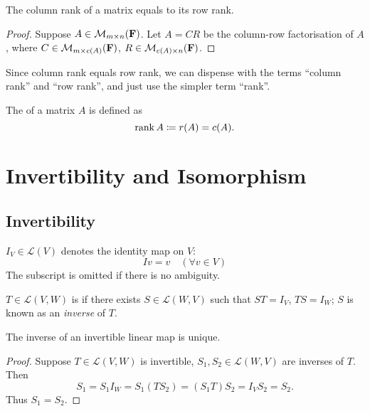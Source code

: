 \begin{lemma}
The column rank of a matrix equals to its row rank.
\end{lemma}

\begin{proof}
Suppose $A\in\mathcal{M}_{m\times n}(\mathbf F)$. Let $A=CR$ be the column-row factorisation of $A$, where $C\in\mathcal{M}_{m\times c(A)}(\mathbf F)$, $R\in\mathcal{M}_{c(A)\times n}(\mathbf F)$.


\end{proof}

Since column rank equals row rank, we can dispense with the terms ``column rank'' and ``row rank'', and just use the simpler
term ``rank''.

\begin{definition}[Rank]
The  of a matrix $A$ is defined as
\[\rank A\coloneqq r(A)=c(A).\]
\end{definition}
\pagebreak

\section{Invertibility and Isomorphism}
\subsection{Invertibility}
\begin{notation}
$I_V\in\mathcal{L}(V)$ denotes the identity map on $V$:
\[Iv=v\quad(\forall v\in V)\]
The subscript is omitted if there is no ambiguity.
\end{notation}

\begin{definition}[Invertibility]
$T\in\mathcal{L}(V,W)$ is  if there exists $S\in\mathcal{L}(W,V)$ such that $ST=I_V$, $TS=I_W$; $S$ is known as an \emph{inverse} of $T$.
\end{definition}

\begin{proposition}
The inverse of an invertible linear map is unique.
\end{proposition}

\begin{proof}
Suppose $T\in\mathcal{L}(V,W)$ is invertible, $S_1,S_2\in\mathcal{L}(W,V)$ are inverses of $T$. Then
\[S_1=S_1I_W=S_1(TS_2)=(S_1T)S_2=I_VS_2=S_2.\]
Thus $S_1=S_2$.
\end{proof}

